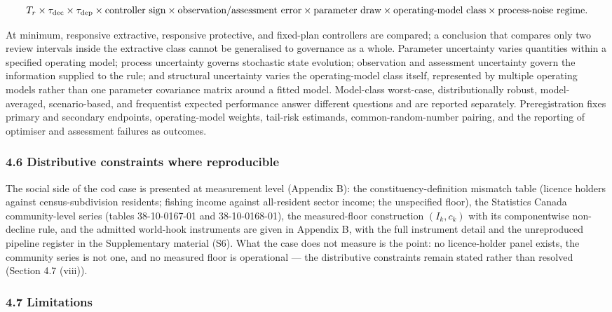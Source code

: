 \documentclass[11pt]{article}
\begin{document}
\[
T_r\times\tau_{\rm dec}\times\tau_{\rm dep}\times\text{controller sign}\times\text{observation/assessment error}\times\text{parameter draw}\times\text{operating-model class}\times\text{process-noise regime}.
\]

At minimum, responsive extractive, responsive protective, and fixed-plan
controllers are compared; a conclusion that compares only two review
intervals inside the extractive class cannot be generalised to
governance as a whole. Parameter uncertainty varies quantities within a
specified operating model; process uncertainty governs stochastic state
evolution; observation and assessment uncertainty govern the information
supplied to the rule; and structural uncertainty varies the
operating-model class itself, represented by multiple operating models
rather than one parameter covariance matrix around a fitted model.
Model-class worst-case, distributionally robust, model-averaged, scenario-based, and frequentist expected performance answer different questions and are reported separately. Preregistration fixes primary and secondary endpoints, operating-model weights, tail-risk estimands, common-random-number pairing, and the reporting of optimiser and assessment failures as outcomes.

\subsubsection{4.6 Distributive constraints where
reproducible}\label{distributive-constraints-where-reproducible}

The social side of the cod case is presented at measurement level (Appendix B): the constituency-definition
mismatch table (licence holders against census-subdivision residents;
fishing income against all-resident sector income; the unspecified
floor), the Statistics Canada community-level series (tables
38-10-0167-01 and 38-10-0168-01), the measured-floor construction
\((I_k, c_k)\) with its componentwise non-decline rule, and the admitted
world-hook instruments are given in Appendix B, with the full
instrument detail and the unreproduced pipeline register in the
Supplementary material (S6). What the case does not measure is the
point: no licence-holder panel exists, the community series is not
one, and no measured floor is operational --- the distributive
constraints remain stated rather than resolved (Section 4.7 (viii)).

\subsubsection{4.7 Limitations}\label{limitations}
\end{document}
